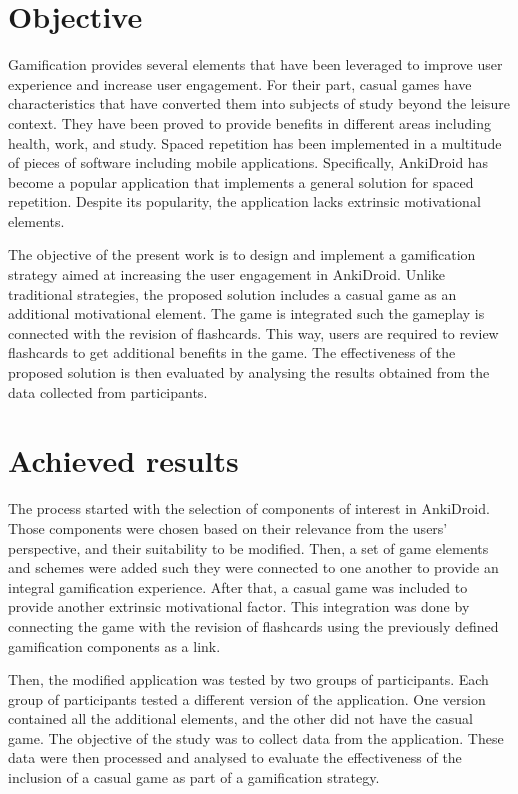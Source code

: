 \section{Objective}
Gamification provides several elements that have been leveraged to improve user experience and increase user engagement. For their part, casual games have characteristics that have converted them into subjects of study beyond the leisure context. They have been proved to provide benefits in different areas including health, work, and study. Spaced repetition has been implemented in a multitude of pieces of software including mobile applications. Specifically, AnkiDroid \citep{raoul2012ankidroid} has become a popular application that implements a general solution for spaced repetition. Despite its popularity, the application lacks extrinsic motivational elements.

The objective of the present work is to design and implement a gamification strategy aimed at increasing the user engagement in AnkiDroid. Unlike traditional strategies, the proposed solution includes a casual game as an additional motivational element. The game is integrated such the gameplay is connected with the revision of flashcards. This way, users are required to review flashcards to get additional benefits in the game.
The effectiveness of the proposed solution is then evaluated by analysing the results obtained from the data collected from participants.


\section{Achieved results}
The process started with the selection of components of interest in AnkiDroid. Those components were chosen based on their relevance from the users' perspective, and their suitability to be modified. Then, a set of game elements and schemes were added such they were connected to one another to provide an integral gamification experience. After that, a casual game was included to provide another extrinsic motivational factor. This integration was done by connecting the game with the revision of flashcards using the previously defined gamification components as a link.

Then, the modified application was tested by two groups of participants. Each group of participants tested a different version of the application. One version contained all the additional elements, and the other did not have the casual game. The objective of the study was to collect data from the application. These data were then processed and analysed to evaluate the effectiveness of the inclusion of a casual game as part of a gamification strategy.

